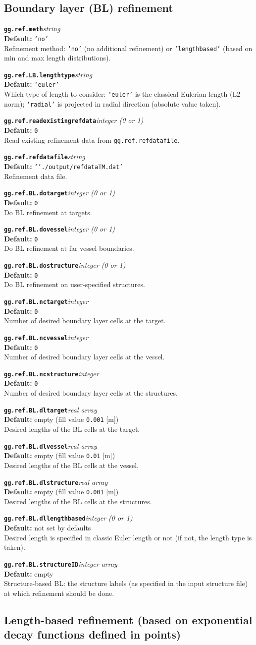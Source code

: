 \documentclass[10pt,a4paper]{article}
\newcommand{\sw}[4]{%
  \par\vspace{0.7em}%
  \begin{minipage}{\linewidth}\raggedright
    \textbf{\texttt{#1}}\hfill\textit{#2}\\[0.1em]
    \textbf{Default:} #3\\[0.1em]
    #4\par
    \vspace{0.3em}{\color{swgrey}\hrule}
  \end{minipage}\par}
\begin{document}
\subsection*{Boundary layer (BL) refinement}
\sw{gg.ref.meth}{string}{\texttt{`no'}}{Refinement method: \texttt{`no'} (no additional refinement) or \texttt{`lengthbased'} (based on min and max length distributions).}
\sw{gg.ref.LB.lengthtype}{string}{\texttt{`euler'}}{Which type of length to consider: \texttt{`euler'} is the classical Eulerian length (L2 norm); \texttt{`radial'} is projected in radial direction (absolute value taken).}
\sw{gg.ref.readexistingrefdata}{integer (0 or 1)}{\texttt{0}}{Read existing refinement data from \texttt{gg.ref.refdatafile}.}
\sw{gg.ref.refdatafile}{string}{\texttt{`'./output/refdataTM.dat'}}{Refinement data file.}
\sw{gg.ref.BL.dotarget}{integer (0 or 1)}{\texttt{0}}{Do BL refinement at targets.}
\sw{gg.ref.BL.dovessel}{integer (0 or 1)}{\texttt{0}}{Do BL refinement at far vessel boundaries.}
\sw{gg.ref.BL.dostructure}{integer (0 or 1)}{\texttt{0}}{Do BL refinement on user-specified structures.}
\sw{gg.ref.BL.nctarget}{integer}{\texttt{0}}{Number of desired boundary layer cells at the target.}
\sw{gg.ref.BL.ncvessel}{integer}{\texttt{0}}{Number of desired boundary layer cells at the vessel.}
\sw{gg.ref.BL.ncstructure}{integer}{\texttt{0}}{Number of desired boundary layer cells at the structures.}
\sw{gg.ref.BL.dltarget}{real array}{empty (fill value \texttt{0.001} [m])}{Desired lengths of the BL cells at the target.}
\sw{gg.ref.BL.dlvessel}{real array}{empty (fill value \texttt{0.01} [m])}{Desired lengths of the BL cells at the vessel.}
\sw{gg.ref.BL.dlstructure}{real array}{empty (fill value \texttt{0.001} [m])}{Desired lengths of the BL cells at the structures.}
\sw{gg.ref.BL.dllengthbased}{integer (0 or 1)}{not set by defaults}{Desired length is specified in classic Euler length or not (if not, the length type is taken).}
\sw{gg.ref.BL.structureID}{integer array}{empty}{Structure-based BL: the structure labels (as specified in the input structure file) at which refinement should be done.}

\subsection*{Length-based refinement (based on exponential decay functions defined in points)}
\end{document}
